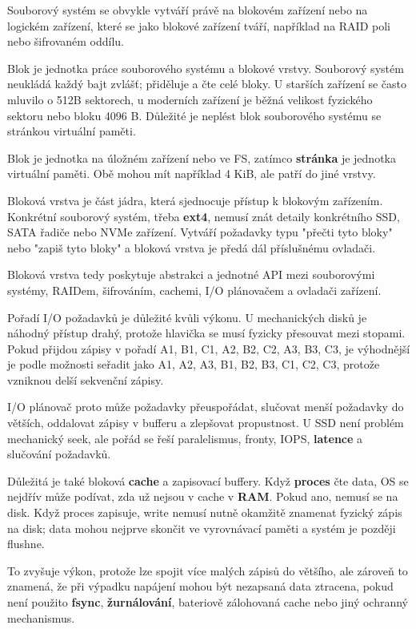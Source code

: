Souborový systém se obvykle vytváří právě na blokovém zařízení nebo na logickém zařízení, které se jako blokové zařízení tváří, například na RAID poli nebo šifrovaném oddílu.

Blok je jednotka práce souborového systému a blokové vrstvy. Souborový systém neukládá každý bajt zvlášť; přiděluje a čte celé bloky. U starších zařízení se často mluvilo o 512B sektorech, u moderních zařízení je běžná velikost fyzického sektoru nebo bloku 4096 B. Důležité je neplést blok souborového systému se stránkou virtuální paměti.

Blok je jednotka na úložném zařízení nebo ve FS, zatímco \textbf{stránka} je jednotka virtuální paměti. Obě mohou mít například 4 KiB, ale patří do jiné vrstvy.

Bloková vrstva je část jádra, která sjednocuje přístup k blokovým zařízením. Konkrétní souborový systém, třeba \textbf{ext4}, nemusí znát detaily konkrétního SSD, SATA řadiče nebo NVMe zařízení. Vytváří požadavky typu "přečti tyto bloky" nebo "zapiš tyto bloky" a bloková vrstva je předá dál příslušnému ovladači.

Bloková vrstva tedy poskytuje abstrakci a jednotné API mezi souborovými systémy, RAIDem, šifrováním, cachemi, I/O plánovačem a ovladači zařízení.

Pořadí I/O požadavků je důležité kvůli výkonu. U mechanických disků je náhodný přístup drahý, protože hlavička se musí fyzicky přesouvat mezi stopami. Pokud přijdou zápisy v pořadí A1, B1, C1, A2, B2, C2, A3, B3, C3, je výhodnější je podle možnosti seřadit jako A1, A2, A3, B1, B2, B3, C1, C2, C3, protože vzniknou delší sekvenční zápisy.

I/O plánovač proto může požadavky přeuspořádat, slučovat menší požadavky do větších, oddalovat zápisy v bufferu a zlepšovat propustnost. U SSD není problém mechanický seek, ale pořád se řeší paralelismus, fronty, IOPS, \textbf{latence} a slučování požadavků.

Důležitá je také bloková \textbf{cache} a zapisovací buffery. Když \textbf{proces} čte data, OS se nejdřív může podívat, zda už nejsou v cache v \textbf{RAM}. Pokud ano, nemusí se na disk. Když proces zapisuje, write nemusí nutně okamžitě znamenat fyzický zápis na disk; data mohou nejprve skončit ve vyrovnávací paměti a systém je později flushne.

To zvyšuje výkon, protože lze spojit více malých zápisů do většího, ale zároveň to znamená, že při výpadku napájení mohou být nezapsaná data ztracena, pokud není použito \textbf{fsync}, \textbf{žurnálování}, bateriově zálohovaná cache nebo jiný ochranný mechanismus.

